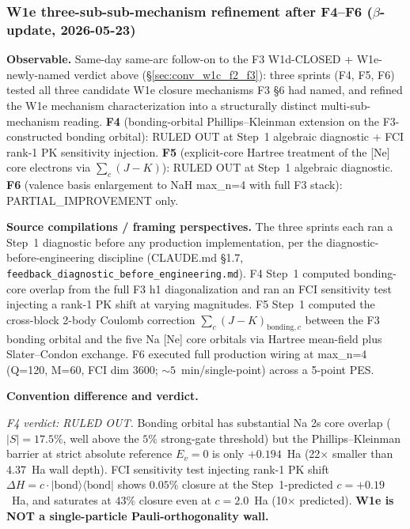 \documentclass[11pt]{article}
\begin{document}
\subsubsection{W1e three-sub-sub-mechanism refinement after F4--F6
($\beta$-update, 2026-05-23)}
\label{sec:conv_w1e_f4_f6_refinement}

\textbf{Observable.} Same-day same-arc follow-on to the F3 W1d-CLOSED
+ W1e-newly-named verdict above (\S\ref{sec:conv_w1c_f2_f3}): three
sprints (F4, F5, F6) tested all three candidate W1e closure mechanisms
F3 §6 had named, and refined the W1e mechanism characterization into
a structurally distinct multi-sub-mechanism reading. \textbf{F4}
(bonding-orbital Phillips--Kleinman extension on the F3-constructed
bonding orbital): RULED OUT at Step~1 algebraic diagnostic +
FCI rank-1 PK sensitivity injection. \textbf{F5} (explicit-core
Hartree treatment of the [Ne] core electrons via $\sum_c (J - K)$):
RULED OUT at Step~1 algebraic diagnostic. \textbf{F6} (valence
basis enlargement to NaH max\_n=4 with full F3 stack):
PARTIAL\_IMPROVEMENT only.

\textbf{Source compilations / framing perspectives.} The three
sprints each ran a Step~1 diagnostic before any production
implementation, per the diagnostic-before-engineering discipline
(CLAUDE.md §1.7, \texttt{feedback\_diagnostic\_before\_engineering.md}).
F4 Step~1 computed bonding-core overlap from the full F3 h1
diagonalization and ran an FCI sensitivity test injecting a rank-1
PK shift at varying magnitudes. F5 Step~1 computed the cross-block
2-body Coulomb correction $\sum_c (J - K)_{\text{bonding},c}$
between the F3 bonding orbital and the five Na [Ne] core orbitals
via Hartree mean-field plus Slater--Condon exchange. F6 executed
full production wiring at max\_n=4 (Q=120, M=60, FCI dim 3600;
${\sim}5$~min/single-point) across a 5-point PES.

\textbf{Convention difference and verdict.}

\emph{F4 verdict: RULED OUT.} Bonding orbital has substantial Na 2s
core overlap ($|S| = 17.5\%$, well above the $5\%$ strong-gate
threshold) but the Phillips--Kleinman barrier at strict absolute
reference $E_v = 0$ is only $+0.194$~Ha (22$\times$ smaller than
4.37~Ha wall depth). FCI sensitivity test injecting rank-1 PK shift
$\Delta H = c \cdot |\text{bond}\rangle\langle\text{bond}|$ shows
$0.05\%$ closure at the Step~1-predicted $c = +0.19$~Ha, and
saturates at $43\%$ closure even at $c = 2.0$~Ha (10$\times$
predicted). \textbf{W1e is NOT a single-particle Pauli-orthogonality
wall.}
\end{document}
